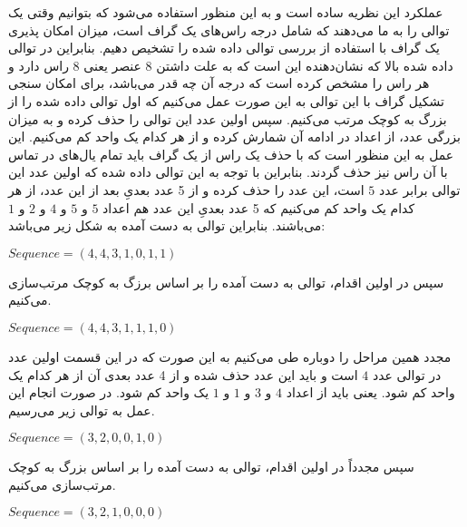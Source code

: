 \documentclass[a4paper,10pt]{article}
\begin{document}
    عملکرد این نظریه ساده است و به این منظور استفاده می‌شود که بتوانیم وقتی یک توالی را به ما می‌دهند که شامل درجه راس‌های یک گراف است، میزان امکان پذیری یک گراف با استفاده از بررسی توالی داده شده را تشخیص دهیم. بنابراین در توالی داده شده بالا که نشان‌دهنده این است که به علت داشتن 8 عنصر یعنی 8 راس دارد  و هر راس را مشخص کرده است که درجه آن چه قدر می‌باشد، برای امکان سنجی تشکیل گراف با این توالی به این صورت عمل می‌کنیم که اول توالی داده شده را از بزرگ به کوچک مرتب می‌کنیم. سپس اولین عدد این توالی را حذف کرده و به میزان بزرگی عدد، از اعداد در ادامه آن شمارش کرده و از هر کدام یک واحد کم می‌کنیم. این عمل به این منظور است که با حذف یک راس از یک گراف باید تمام یال‌های در تماس با آن راس نیز حذف گردند. بنابراین با توجه به این توالی داده شده که اولین عدد این توالی برابر عدد $5$ است، این عدد را حذف کرده و از 5 عدد بعدیِ بعد از این عدد، از هر کدام یک واحد کم می‌کنیم که 5 عدد بعدیِ این عدد هم اعداد $5$ و $5$ و $4$ و $2$ و $1$ می‌باشند. بنابراین توالی به دست آمده به شکل زیر می‌باشد:

    \begin{center}
        
        $Sequence = (4,4,3,1,0,1,1)$

    \end{center}

    سپس در اولین اقدام، توالی به دست آمده را بر اساس برزگ به کوچک مرتب‌سازی می‌کنیم.

    \begin{center}
        
        $Sequence = (4,4,3,1,1,1,0)$

    \end{center}

    مجدد همین مراحل را دوباره طی می‌کنیم به این صورت که در این قسمت اولین عدد در توالی عدد $4$ است و باید این عدد حذف شده و از 4 عدد بعدی آن از هر کدام یک واحد کم شود. یعنی باید از اعداد $4$ و $3$ و $1$ و $1$ یک واحد کم شود. در صورت انجام این عمل به توالی زیر می‌رسیم.

    \begin{center}
        
        $Sequence = (3,2,0,0,1,0)$

    \end{center}

    سپس مجدداً در اولین اقدام، توالی به دست آمده را بر اساس بزرگ به کوچک مرتب‌سازی می‌‌کنیم.

    \begin{center}
        
        $Sequence = (3,2,1,0,0,0)$

    \end{center}
\end{document}

